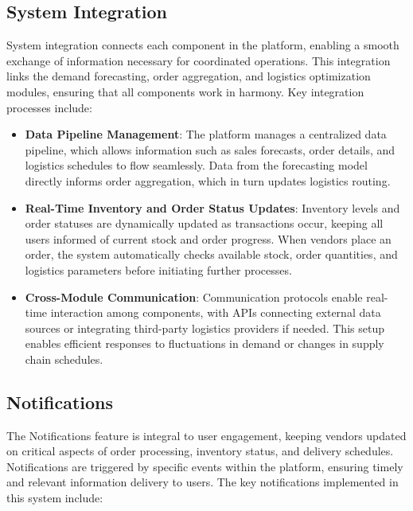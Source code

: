 \subsection{System Integration}

System integration connects each component in the platform, enabling a smooth exchange of information necessary for coordinated operations. This integration links the demand forecasting, order aggregation, and logistics optimization modules, ensuring that all components work in harmony. Key integration processes include:

\begin{itemize}
    \item \textbf{Data Pipeline Management}: The platform manages a centralized data pipeline, which allows information such as sales forecasts, order details, and logistics schedules to flow seamlessly. Data from the forecasting model directly informs order aggregation, which in turn updates logistics routing.
    \item \textbf{Real-Time Inventory and Order Status Updates}: Inventory levels and order statuses are dynamically updated as transactions occur, keeping all users informed of current stock and order progress. When vendors place an order, the system automatically checks available stock, order quantities, and logistics parameters before initiating further processes.
    \item \textbf{Cross-Module Communication}: Communication protocols enable real-time interaction among components, with APIs connecting external data sources or integrating third-party logistics providers if needed. This setup enables efficient responses to fluctuations in demand or changes in supply chain schedules.
\end{itemize}

\subsection{Notifications}

The Notifications feature is integral to user engagement, keeping vendors updated on critical aspects of order processing, inventory status, and delivery schedules. Notifications are triggered by specific events within the platform, ensuring timely and relevant information delivery to users. The key notifications implemented in this system include:

